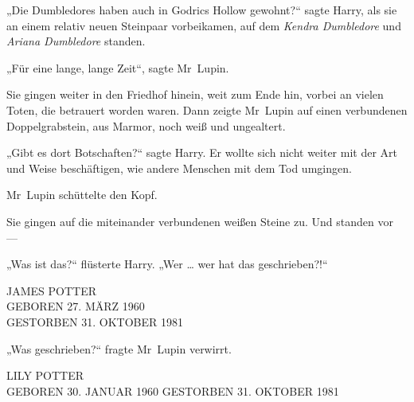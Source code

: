 „Die Dumbledores haben auch in Godrics Hollow gewohnt?“ sagte Harry, als sie an einem relativ neuen Steinpaar vorbeikamen, auf dem \emph{Kendra Dumbledore} und \emph{Ariana Dumbledore} standen.

„Für eine lange, lange Zeit“, sagte Mr~Lupin.


Sie gingen weiter in den Friedhof hinein, weit zum Ende hin, vorbei an vielen Toten, die betrauert worden waren. Dann zeigte Mr~Lupin auf einen verbundenen Doppelgrabstein, aus Marmor, noch weiß und ungealtert.

„Gibt es dort Botschaften?“ sagte Harry. Er wollte sich nicht weiter mit der Art und Weise beschäftigen, wie andere Menschen mit dem Tod umgingen.

Mr~Lupin schüttelte den Kopf.


Sie gingen auf die miteinander verbundenen weißen Steine zu. Und standen vor —

„Was ist das?“ flüsterte Harry.
„Wer … wer hat das geschrieben?!“

\begin{center}
JAMES POTTER\\
GEBOREN 27. MÄRZ 1960\\
GESTORBEN 31. OKTOBER 1981
\end{center}

„Was geschrieben?“ fragte Mr~Lupin verwirrt.

\begin{center}
LILY POTTER\\
GEBOREN 30. JANUAR 1960
GESTORBEN 31. OKTOBER 1981
\end{center}


